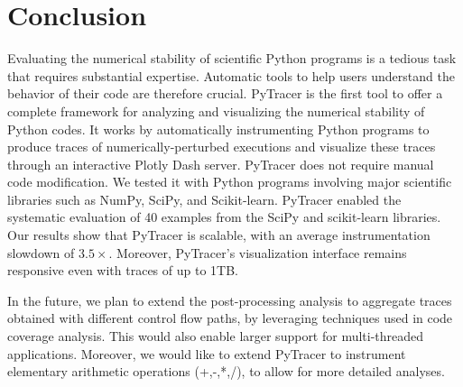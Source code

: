 \documentclass[10pt,journal,compsoc]{IEEEtran}
\newcommand{\pytracer}[0]{PyTracer\xspace}
\DeclareRobustCommand{\add}[1]{\textcolor{ao(english)}{#1}}%
\DeclareRobustCommand{\remove}[1]{}
\DeclareRobustCommand{\add}[1]{#1}
\DeclareRobustCommand{\remove}[1]{}
\begin{document}
\section{Conclusion}



Evaluating the numerical stability of scientific Python programs is a tedious
task that requires substantial expertise. Automatic tools to help users
understand the behavior of their code are therefore crucial. \pytracer is the
first tool to offer a complete framework for analyzing and visualizing the
numerical stability of Python codes. It works by automatically instrumenting
Python programs to produce traces \add{of numerically-perturbed executions and}
visualize these traces through an interactive Plotly Dash server. \pytracer does
not require manual code modification. We tested it with \add{Python programs
    involving} major scientific libraries such as NumPy, SciPy, and Scikit-learn.
\pytracer enabled the systematic evaluation of 40 examples from the SciPy and
scikit-learn libraries. Our results show that \pytracer is scalable, with an
average instrumentation slowdown of $3.5\times$. Moreover, \pytracer's
visualization interface remains responsive even with traces of up to 1TB.  

In the future, we plan to extend the post-processing analysis to aggregate
traces \add{obtained with different control flow paths,} by leveraging
techniques used in code coverage analysis. \add{This would also enable larger
    support for multi-threaded applications.} Moreover, we would like to extend
\pytracer to instrument elementary arithmetic operations \add{(+,-,*,/), to
    allow for more detailed analyses}. \remove{Finally, although \pytracer supports
    multiple noise models, we only tested it with Monte-Carlo arithmetic. Therefore,
    we would like to compare different models against MCA.}





\end{document}
